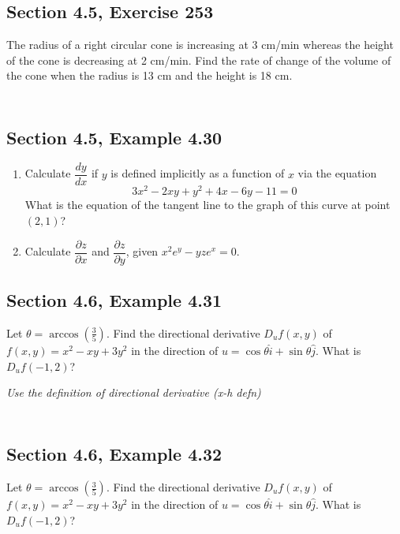 \documentclass[]{mangos-musings}
\begin{document}
\subsection{Section 4.5, Exercise 253}
The radius of a right circular cone is increasing at 3
cm/min whereas the height of the cone is decreasing at 2 cm/min. 
Find the rate of change of the volume of the cone when the radius is 13 cm and the height is 18 cm.
\begin{align*}
  \\ \\ \\
\end{align*}
\subsection{Section 4.5, Example 4.30}
\begin{enumerate}[label=(\alph*)]
  \item Calculate $\dfrac{dy}{dx}$ if $y$ is defined implicitly as a function of $x$ via the equation 
  \[3x^2 - 2xy + y^2 + 4x - 6y - 11 = 0\]
  What is the equation of the tangent line to the graph of this curve at point $(2, 1)$?
  \item Calculate $\dfrac{\partial z}{\partial x}$ and $\dfrac{\partial z}{\partial y}$, given $x^2e^y - yze^x = 0$.
\end{enumerate}

\newpage
\subsection{Section 4.6, Example 4.31}
Let $\theta = \arccos (\frac{3}{5})$. Find the directional derivative $D_u f(x, y)$ of $f(x, y) = x^2 - xy + 3y^2$ in the direction of $u = \cos \theta \hat{i} + \sin\theta\hat{j}$. What is $D_u f(-1, 2)$?

\textit{Use the definition of directional derivative (x-h defn)}
\begin{align*}
  \\ \\ \\
\end{align*}

\subsection{Section 4.6, Example 4.32}
Let $\theta = \arccos (\frac{3}{5})$. Find the directional derivative $D_u f(x, y)$ of $f(x, y) = x^2 - xy + 3y^2$ in the direction of $u = \cos \theta \hat{i} + \sin\theta\hat{j}$. What is $D_u f(-1, 2)$?
\end{document}
